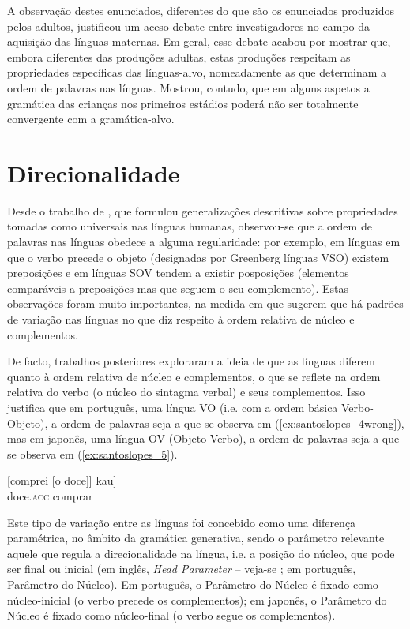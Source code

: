 \documentclass[output=paper]{LSP/langsci}
\begin{document}
A observação destes enunciados, diferentes do que são os enunciados produzidos pelos adultos, justificou um aceso debate entre investigadores no campo da aquisição das línguas maternas. Em geral, esse debate acabou por mostrar que, embora diferentes das produções adultas, estas produções respeitam as propriedades específicas das línguas-alvo, nomeadamente as que determinam a ordem de palavras nas línguas. Mostrou, contudo, que em alguns aspetos a gramática das crianças nos primeiros estádios poderá não ser totalmente convergente com a gramática-alvo.

\section{Direcionalidade}
\label{sec:santoslopes_direcionalidade}
Desde o trabalho de \citet{greenberg1963}, que formulou generalizações descritivas sobre propriedades tomadas como universais nas línguas humanas, observou-se que a ordem de palavras nas línguas obedece a alguma regularidade: por exemplo, em línguas em que o verbo precede o objeto (designadas por Greenberg línguas VSO) existem preposições e em línguas SOV tendem a existir posposições (elementos comparáveis a preposições mas que seguem o seu complemento). Estas observações foram muito importantes, na medida em que sugerem que há padrões de variação nas línguas no que diz respeito à ordem relativa de núcleo e complementos.

De facto, trabalhos posteriores exploraram a ideia de que as línguas diferem quanto à ordem relativa de núcleo e complementos, o que se reflete na ordem relativa do verbo (o núcleo do sintagma verbal) e seus complementos. Isso justifica que em português, uma língua VO (i.e. com a ordem básica Verbo-Objeto), a ordem de palavras seja a que se observa em (\ref{ex:santoslopes_4wrong}), mas em japonês, uma língua OV (Objeto-Verbo), a ordem de palavras seja a que se observa em (\ref{ex:santoslopes_5}).

\ea\label{ex:santoslopes_4wrong}
[comprei [o doce]]
\z
\ea\label{ex:santoslopes_5}
\gll [[okashi-o] kau]\\
doce.\textsc{acc} comprar\\
\z

Este tipo de variação entre as línguas foi concebido como uma diferença paramétrica, no âmbito da gramática generativa, sendo o parâmetro relevante aquele que regula a direcionalidade na língua, i.e. a posição do núcleo, que pode ser final ou inicial (em inglês, \textit{Head Parameter} – veja-se \citealt{travis1984}; em português, Parâmetro do Núcleo). Em português, o Parâmetro do Núcleo é fixado como núcleo-inicial (o verbo precede os complementos); em japonês, o Parâmetro do Núcleo é fixado como núcleo-final (o verbo segue os complementos).
\end{document}

